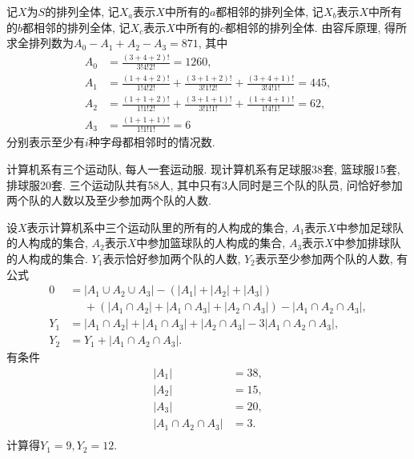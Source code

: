 \documentclass[chinese]{assignment}[2019/10/15]
\begin{document}
    \begin{solution}
        记$X$为$S$的排列全体, 记$X_a$表示$X$中所有的$a$都相邻的排列全体, 记$X_b$表示$X$中所有的$b$都相邻的排列全体, 记$X_c$表示$X$中所有的$c$都相邻的排列全体. 由容斥原理, 得所求全排列数为$A_0-A_1+A_2-A_3=871$, 其中
        \begin{equation}
            \begin{aligned}
                A_0 &= \frac{(3+4+2)!}{3!4!2!}=1260,\\
                A_1 &= \frac{(1+4+2)!}{1!4!2!}+\frac{(3+1+2)!}{3!1!2!}+\frac{(3+4+1)!}{3!4!1!}=445,\\
                A_2 &= \frac{(1+1+2)!}{1!1!2!}+\frac{(3+1+1)!}{3!1!1!}+\frac{(1+4+1)!}{1!4!1!}=62,\\
                A_3 &= \frac{(1+1+1)!}{1!1!1!}=6
            \end{aligned}
        \end{equation}
        分别表示至少有$i$种字母都相邻时的情况数.
    \end{solution}
    \begin{problem}
        计算机系有三个运动队, 每人一套运动服. 现计算机系有足球服38套, 篮球服15套, 排球服20套. 三个运动队共有58人, 其中只有3人同时是三个队的队员, 问恰好参加两个队的人数以及至少参加两个队的人数.
    \end{problem}
    \begin{solution}
        设$X$表示计算机系中三个运动队里的所有的人构成的集合, $A_1$表示$X$中参加足球队的人构成的集合, $A_2$表示$X$中参加篮球队的人构成的集合, $A_3$表示$X$中参加排球队的人构成的集合. $Y_1$表示恰好参加两个队的人数, $Y_2$表示至少参加两个队的人数, 有公式
        \begin{equation}
            \begin{aligned}
                0 &= |A_1\cup A_2 \cup A_3| - \left(|A_1| + |A_2| + |A_3|\right)\\
                &\phantom{{}={}} + \left(|A_1\cap A_2| + |A_1\cap A_3| + |A_2\cap A_3|\right) - |A_1\cap A_2\cap A_3|,\\
                Y_1 &= |A_1\cap A_2| + |A_1 \cap A_3| + |A_2 \cap A_3| - 3|A_1\cap A_2\cap A_3|,\\
                Y_2 &= Y_1 + |A_1\cap A_2\cap A_3|.
            \end{aligned}
        \end{equation}
        有条件
        \begin{equation}
            \begin{aligned}
                |A_1| &= 38,\\
                |A_2| &= 15,\\
                |A_3| &= 20,\\
                |A_1\cap A_2\cap A_3| &= 3.\\
            \end{aligned}
        \end{equation}
        计算得$Y_1=9, Y_2 = 12$.
    \end{solution}
\end{document}
